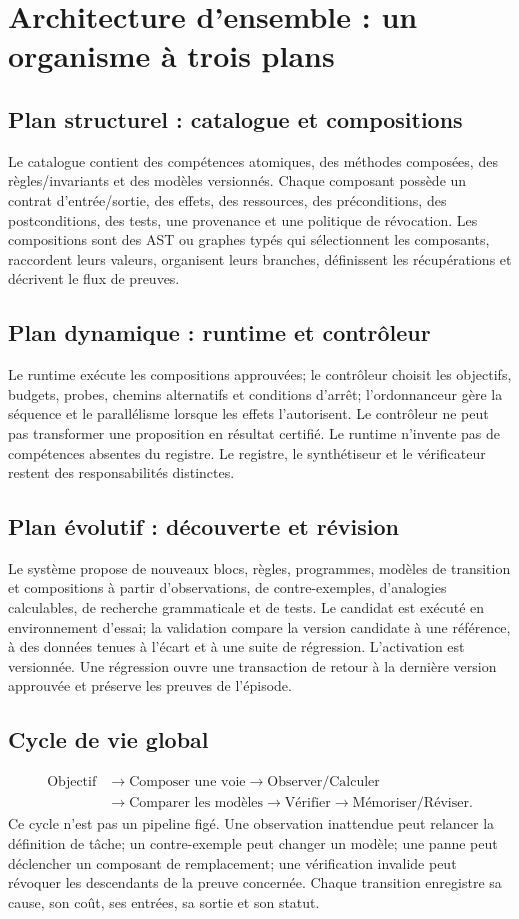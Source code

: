 \documentclass[11pt,a4paper]{article}
\begin{document}
\section{Architecture d'ensemble : un organisme à trois plans}
\subsection{Plan structurel : catalogue et compositions}
Le catalogue contient des compétences atomiques, des méthodes composées, des règles/invariants et des modèles versionnés. Chaque composant possède un contrat d'entrée/sortie, des effets, des ressources, des préconditions, des postconditions, des tests, une provenance et une politique de révocation. Les compositions sont des AST ou graphes typés qui sélectionnent les composants, raccordent leurs valeurs, organisent leurs branches, définissent les récupérations et décrivent le flux de preuves.

\subsection{Plan dynamique : runtime et contrôleur}
Le runtime exécute les compositions approuvées; le contrôleur choisit les objectifs, budgets, probes, chemins alternatifs et conditions d'arrêt; l'ordonnanceur gère la séquence et le parallélisme lorsque les effets l'autorisent. Le contrôleur ne peut pas transformer une proposition en résultat certifié. Le runtime n'invente pas de compétences absentes du registre. Le registre, le synthétiseur et le vérificateur restent des responsabilités distinctes.

\subsection{Plan évolutif : découverte et révision}
Le système propose de nouveaux blocs, règles, programmes, modèles de transition et compositions à partir d'observations, de contre-exemples, d'analogies calculables, de recherche grammaticale et de tests. Le candidat est exécuté en environnement d'essai; la validation compare la version candidate à une référence, à des données tenues à l'écart et à une suite de régression. L'activation est versionnée. Une régression ouvre une transaction de retour à la dernière version approuvée et préserve les preuves de l'épisode.

\subsection{Cycle de vie global}
\[
\begin{aligned}
\text{Objectif} &\to \text{Composer une voie} \to \text{Observer/Calculer}\\
&\to \text{Comparer les modèles} \to \text{Vérifier} \to \text{Mémoriser/Réviser}.
\end{aligned}
\]
Ce cycle n'est pas un pipeline figé. Une observation inattendue peut relancer la définition de tâche; un contre-exemple peut changer un modèle; une panne peut déclencher un composant de remplacement; une vérification invalide peut révoquer les descendants de la preuve concernée. Chaque transition enregistre sa cause, son coût, ses entrées, sa sortie et son statut.
\end{document}
